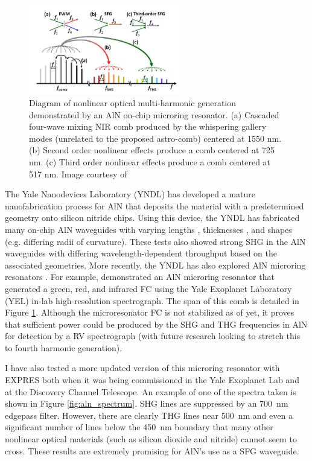 \documentclass[11pt]{article}
\begin{document}
\begin{figure}
    \centering
    \includegraphics[width=0.6\textwidth]{images/sfg_example.png}
    \caption{Diagram of nonlinear optical multi-harmonic generation demonstrated by an AlN on-chip microring resonator. (a) Cascaded four-wave mixing NIR comb produced by the whispering gallery modes (unrelated to the proposed astro-comb) centered at 1550 nm. (b) Second order nonlinear effects produce a comb centered at 725 nm. (c) Third order nonlinear effects produce a comb centered at 517 nm. Image courtesy of \cite{Jung2014a}}
    \label{fig:sfg_example}
\end{figure}

The Yale Nanodevices Laboratory (YNDL) has developed a mature nanofabrication process for AlN that deposits the material with a predetermined geometry onto silicon nitride chips. Using this device, the YNDL has fabricated many on-chip AlN waveguides with varying lengths \citep[\SI{300}{\micro\meter} to \SI{3}{\centi\meter};][]{Xiong2012a}, thicknesses \citep[330--\SI{1500}{\nano\meter};][]{Pernice2012}, and shapes (e.g. differing radii of curvature). These tests also showed strong SHG in the AlN waveguides with differing wavelength-dependent throughput based on the associated geometries. More recently, the YNDL has also explored AlN microring resonators \citep{Jung2013, Guo2016}. For example, \citet{Jung2014a} demonstrated an AlN microring resonator that generated a green, red, and infrared FC using the Yale Exoplanet Laboratory (YEL) in-lab high-resolution spectrograph. The span of this comb is detailed in Figure \ref{fig:sfg_example}. Although the microresonator FC is not stabilized as of yet, it proves that sufficient power could be produced by the SHG and THG frequencies in AlN for detection by a RV spectrograph (with future research looking to stretch this to fourth harmonic generation).

I have also tested a more updated version of this microring resonator with EXPRES both when it was being commissioned in the Yale Exoplanet Lab and at the Discovery Channel Telescope. An example of one of the spectra taken is shown in Figure \ref{fig:aln_spectrum}. SHG lines are suppressed by an \SI{700}{\nano\meter} edgepass filter. However, there are clearly THG lines near \SI{500}{\nano\meter} and even a significant number of lines below the \SI{450}{\nano\meter} boundary that many other nonlinear optical materials (such as silicon dioxide and nitride) cannot seem to cross. These results are extremely promising for AlN's use as a SFG waveguide.
\end{document}
